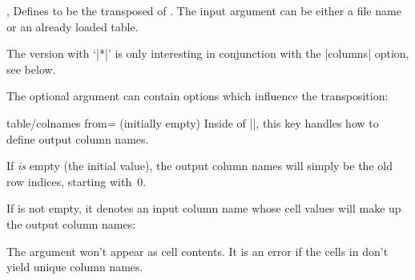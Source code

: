 \begin{commandlist}{%
    \pgfplotstabletranspose{},
    \pgfplotstabletranspose*{}%
}
    Defines  to be the transposed of
    . The input argument can be either a
    file name or an already loaded table.

    The version with `|*|' is only interesting in conjunction with the
    |columns| option, see below.
\begin{codeexample}[pre={\begin{lateximage}},post={\end{lateximage}}]
\end{codeexample}

\begin{codeexample}[pre={\begin{lateximage}},post={\end{lateximage}}]
\pgfplotstabletranspose{}
\loadedtable
\end{codeexample}

    The optional argument  can contain options which influence
    the transposition:
    \begin{pgfplotskey}{table/colnames from= (initially empty)}
        Inside of |\pgfplotstabletranspose|, this key handles how to define
        output column names.

        If  \emph{is} empty (the initial value), the output
        column names will simply be the old row indices, starting with~$0$.

        If  is not empty, it denotes an input column name whose
        cell values will make up the output column names:
\begin{codeexample}[pre={\begin{lateximage}},post={\end{lateximage}}]
\pgfplotstabletranspose[colnames from=c]
\loadedtable
\end{codeexample}
        The argument  won't appear as cell contents. It is an
        error if the cells in  don't yield unique column names.
    \end{pgfplotskey}


\end{commandlist}
